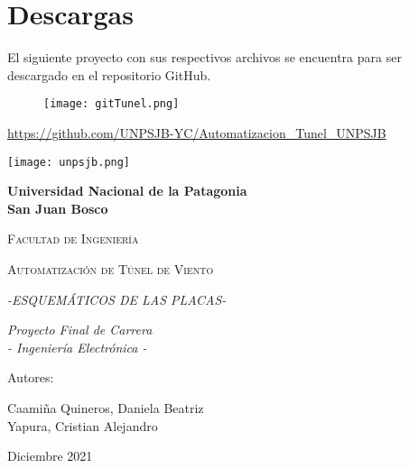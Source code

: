 \section{Descargas}
El siguiente proyecto con sus respectivos archivos se encuentra para ser descargado en el repositorio GitHub.
\begin{figure}[htb]
	\centering
	\texttt{[image: gitTunel.png]}
	\label{fig:git}
\end{figure}

\url{https://github.com/UNPSJB-YC/Automatizacion_Tunel_UNPSJB}
\newpage








\begin{center}
	{\texttt{[image: unpsjb.png]}\par}
	\vspace{1cm}
	{\bfseries\LARGE Universidad Nacional de la Patagonia\\ San Juan Bosco \par}
	\vspace{1cm}
	{\scshape\Large Facultad de Ingenier\'ia \par}
	\vspace{3cm}
	{\scshape\Huge Automatización de Túnel de Viento \par}
	{\itshape\Large -ESQUEMÁTICOS DE LAS PLACAS- \par}
	
	
	\vspace{3cm}
	{\itshape\Large Proyecto Final de Carrera\\ - Ingeniería Electrónica - \par}
	\vfill
	{\Large Autores: \par}
	{\Large Caamiña Quineros, Daniela Beatriz\\ Yapura, Cristian Alejandro \par}
	\vfill
	{\Large Diciembre 2021 \par}
\end{center}





\newpage



